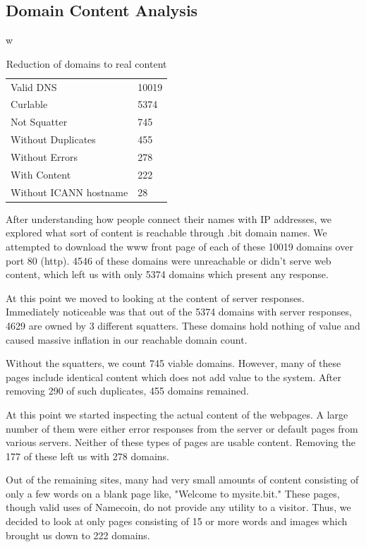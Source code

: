 \subsection{Domain Content Analysis}
\label{domainbreakdown}

w\begin{table}[t]
\begin{tabular}{ll}
Valid DNS          &  10019  \\
Curlable        & 5374     \\
Not Squatter        & 745     \\
Without Duplicates      & 455     \\
Without Errors              & 278    \\
With Content              & 222    \\
Without ICANN hostname   & 28   \\
\end{tabular}
\caption{Reduction of domains to real content}
\end{table}

After understanding how people connect their names with IP addresses, we explored what sort of content is reachable through .bit domain names. We attempted to download the www front page of each of these 10019 domains over port 80 (http). 4546 of these domains were unreachable or didn't serve web content, which left us with only 5374 domains which present any response.

At this point we moved to looking at the content of server responses. Immediately noticeable was that out of the 5374 domains with server responses, 4629 are owned by 3 different squatters. These domains hold nothing of value and caused massive inflation in our reachable domain count.

Without the squatters, we count 745 viable domains. However, many of these pages include identical content which does not add value to the system. After removing 290 of such duplicates, 455 domains remained.

At this point we started inspecting the actual content of the webpages. A large number of them were either error responses from the server or default pages from various servers. Neither of these types of pages are usable content. Removing the 177 of these left us with 278 domains.

Out of the remaining sites, many had very small amounts of content consisting of only a few words on a blank page like, "Welcome to mysite.bit." These pages, though valid uses of Namecoin, do not provide any utility to a visitor. Thus, we decided to look at only pages consisting of 15 or more words and images which brought us down to 222 domains.

